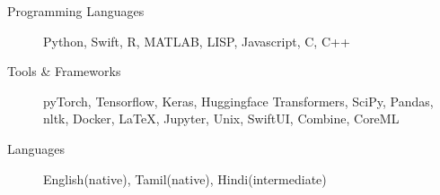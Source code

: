 \begin{description}
\item[Programming Languages] Python, Swift, R, MATLAB, LISP, Javascript, C, C++

\item[Tools \& Frameworks] pyTorch, Tensorflow, Keras, Huggingface Transformers, SciPy, Pandas, nltk, Docker, \LaTeX, Jupyter, Unix, SwiftUI, Combine, CoreML

\item[Languages] English(native), Tamil(native), Hindi(intermediate)
\end{description}
